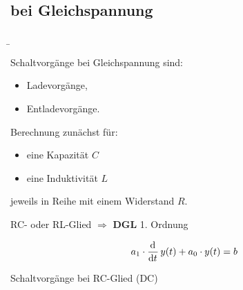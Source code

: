 \subsection{bei Gleichspannung}
\label{sec:schaltvorgaengezeitbereich:dc}
\begin{frame}
%
\b{%
    \centering
    \begin{minipage}{0.48\textwidth}%
        Schaltvorgänge bei Gleichspannung sind:
        \vspace{0.5em}
        \begin{itemize}
            \item Ladevorgänge,
            \item Entladevorgänge.
        \end{itemize}
        \vspace{0.5em}
        \pause
        Berechnung zunächst für:
        \vspace{0.5em}
        \begin{itemize}
            \item eine Kapazität $C$
            \item eine Induktivität $L$
        \end{itemize}
        \vspace{0.5em}
        jeweils in Reihe mit einem Widerstand $R$.
        \pause

        \vspace{1em}
        RC- oder RL-Glied $\Longrightarrow$ \textbf{DGL} 1. Ordnung

        \begin{equation*}
            a_1 \cdot \frac{\mathrm{d}^{{}}}{\mathrm{d}t^{{}}}\, y(t) + a_0 \cdot y(t) = b
        \end{equation*}
    \end{minipage}%
    \begin{minipage}{0.48\textwidth}\centering
        \pause
        Schaltvorgänge bei RC-Glied (DC)
    \end{minipage}
}%


\end{frame}

